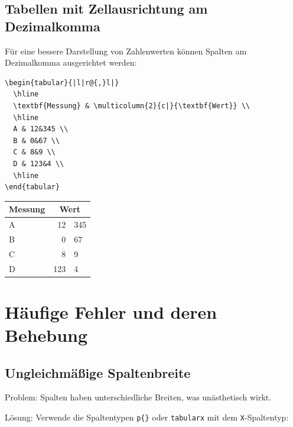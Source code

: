 \documentclass[12pt,a4paper]{article}
\begin{document}
\subsection{Tabellen mit Zellausrichtung am Dezimalkomma}

Für eine bessere Darstellung von Zahlenwerten können Spalten am Dezimalkomma ausgerichtet werden:

\begin{lstlisting}[style=latex]
\begin{tabular}{|l|r@{,}l|}
  \hline
  \textbf{Messung} & \multicolumn{2}{c|}{\textbf{Wert}} \\
  \hline
  A & 12&345 \\
  B & 0&67 \\
  C & 8&9 \\
  D & 123&4 \\
  \hline
\end{tabular}
\end{lstlisting}

\begin{ausgabe}
\begin{center}
\begin{tabular}{|l|r@{,}l|}
  \hline
  \textbf{Messung} & \multicolumn{2}{c|}{\textbf{Wert}} \\
  \hline
  A & 12&345 \\
  B & 0&67 \\
  C & 8&9 \\
  D & 123&4 \\
  \hline
\end{tabular}
\end{center}
\end{ausgabe}

\section{Häufige Fehler und deren Behebung}

\subsection{Ungleichmäßige Spaltenbreite}

Problem: Spalten haben unterschiedliche Breiten, was unästhetisch wirkt.

Lösung: Verwende die Spaltentypen \texttt{p\{\}} oder \texttt{tabularx} mit dem \texttt{X}-Spaltentyp:
\end{document}
